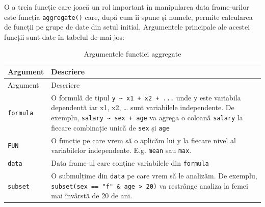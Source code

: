 \documentclass[]{article}
\begin{document}
O a treia funcție care joacă un rol important în manipularea data
frame-urilor este funcția \texttt{aggregate()} care, după cum îi spune
și numele, permite calcularea de funcții pe grupe de date din setul
initial. Argumentele principale ale acestei funcții sunt date în tabelul
de mai jos:

\begin{longtable}[]{@{}ll@{}}
\caption{Argumentele functiei aggregate}\tabularnewline
\toprule
\begin{minipage}[b]{0.19\columnwidth}\raggedright
Argument\strut
\end{minipage} & \begin{minipage}[b]{0.75\columnwidth}\raggedright
Descriere\strut
\end{minipage}\tabularnewline
\midrule
\endfirsthead
\toprule
\begin{minipage}[b]{0.19\columnwidth}\raggedright
Argument\strut
\end{minipage} & \begin{minipage}[b]{0.75\columnwidth}\raggedright
Descriere\strut
\end{minipage}\tabularnewline
\midrule
\endhead
\begin{minipage}[t]{0.19\columnwidth}\raggedright
\texttt{formula}\strut
\end{minipage} & \begin{minipage}[t]{0.75\columnwidth}\raggedright
O formulă de tipul \texttt{y\ \textasciitilde{}\ x1\ +\ x2\ +\ ...} unde
y este variabila dependentă iar x1, x2, \ldots{} sunt variabilele
independente. De exemplu,
\texttt{salary\ \textasciitilde{}\ sex\ +\ age} va agrega o coloană
\texttt{salary} la fiecare combinație unică de \texttt{sex} și
\texttt{age}\strut
\end{minipage}\tabularnewline
\begin{minipage}[t]{0.19\columnwidth}\raggedright
\texttt{FUN}\strut
\end{minipage} & \begin{minipage}[t]{0.75\columnwidth}\raggedright
O funcție pe care vrem să o aplicăm lui y la fiecare nivel al
variabilelor independente. E.g. \texttt{mean} sau \texttt{max}.\strut
\end{minipage}\tabularnewline
\begin{minipage}[t]{0.19\columnwidth}\raggedright
\texttt{data}\strut
\end{minipage} & \begin{minipage}[t]{0.75\columnwidth}\raggedright
Data frame-ul care conține variabilele din \texttt{formula}\strut
\end{minipage}\tabularnewline
\begin{minipage}[t]{0.19\columnwidth}\raggedright
\texttt{subset}\strut
\end{minipage} & \begin{minipage}[t]{0.75\columnwidth}\raggedright
O submulțime din \texttt{data} pe care vrem să le analizăm. De exemplu,
\texttt{subset(sex\ ==\ "f"\ \&\ age\ \textgreater{}\ 20)} va restrânge
analiza la femei mai învârstă de 20 de ani.\strut
\end{minipage}\tabularnewline
\bottomrule
\end{longtable}
\end{document}
